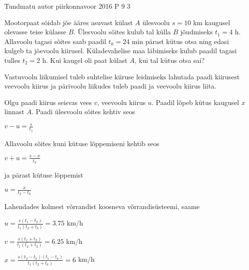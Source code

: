 {Tundmatu autor} %
{piirkonnavoor} %
{2016} %
{P 9} %
{3} %
{
\ifStatement
Mootorpaat sõidab jõe ääres asuvast külast $A$ ülesvoolu $s = 10$ km kaugusel olevasse teise külasse $B$. Ülesvoolu sõites kulub tal külla $B$ jõudmiseks $t_1 = 4$ h. Allavoolu tagasi sõites saab paadil $t_k = 24$ min pärast kütus otsa ning edasi kulgeb ta jõevoolu kiirusel. Küladevahelise maa läbimiseks kulub paadil tagasi tulles $t_2 = 2$ h. Kui kaugel oli paat külast $A$, kui tal kütus otsa sai?
\fi


\ifHint
Vastuvoolu liikumisel tuleb suhtelise kiiruse leidmiseks lahutada paadi kiirusest veevoolu kiirus ja pärivoolu liikudes tuleb paadi ja veevoolu kiirus liita.
\fi

\ifSolution
Olgu paadi kiirus seisvas vees $v$, veevoolu kiirus $u$. Paadil lõpeb kütus kaugusel $x$ linnast $A$.
\newline
Paadi ülesvoolu sõites kehtiv seos
\begin{center}
$ v - u = \frac {s}{t_1}$
\end{center}
Allavoolu sõites kuni kütuse lõppemiseni kehtib seos
\begin{center}
$ v + u = \frac{s-x}{t_k}$
\end{center}
ja pärast kütuse lõppemist
\begin{center}
$u = \frac {x}{t_2 - t_k}$
\end{center}
Lahendades kolmest võrrandist koosneva võrrandisüsteemi, saame
\begin{center}
$u = \frac{s(t_1 - t_2)}{t_1(t_2 + t_k)} = 3.75$ km/h
\end{center}
\begin{center}
$v = \frac {s(t_1 + t_2)}{t_1(t_2 + t_2)} = 6.25$ km/h
\end{center}
\begin{center}
$x = \frac{s(t_2-t_k)(t_1-t_k)}{t_1(t_2 + t_k)} = 6$ km/h
\end{center}
\fi
}